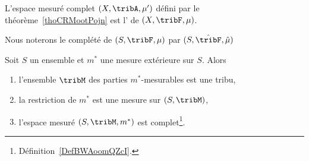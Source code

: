 \begin{definition}
    L'espace mesuré complet \( (X,\tribA,\mu')\) défini par le théorème~\ref{thoCRMootPojn} est l' de \( (X,\tribF,\mu)\).

    Nous noterons le complété de \( (S,\tribF,\mu)\) par \( (S,\hat\tribF,\hat \mu)\)
\end{definition}

\begin{theorem}        \label{ThoUUIooaNljH}
    Soit \( S\) un ensemble et \( m^*\) une mesure extérieure sur \( S\). Alors
    \begin{enumerate}
        \item   \label{RPPooHSWWsi}
            l'ensemble \( \tribM\) des parties \( m^*\)-mesurables est une tribu,
        \item
            la restriction de \( m^*\) est une mesure sur \( (S,\tribM)\),
        \item
            l'espace mesuré \( (S,\tribM,m^*)\) est complet\footnote{Définition~\ref{DefBWAoomQZcI}.}.
    \end{enumerate}
\end{theorem}

